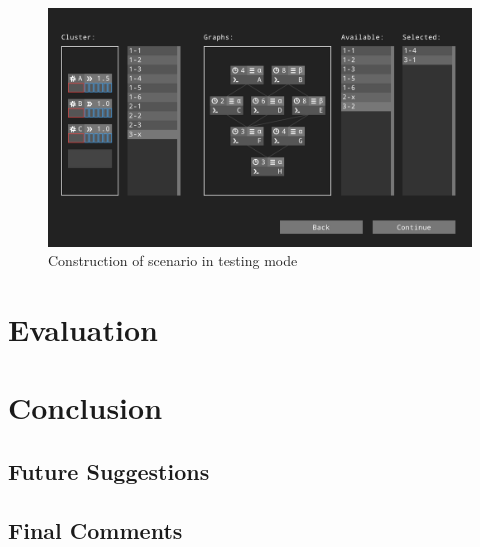 \documentclass[msc,deptreport, cs]{infthesis}
\begin{document}
\begin{figure}[!htb]
  \centering
  \includegraphics[width=\columnwidth]{play3.png}
  \caption{Construction of scenario in testing mode}
  \label{fig:play3}
\end{figure}


\chapter{Evaluation}

\chapter{Conclusion}

\section{Future Suggestions} 


\section{Final Comments}



\end{document}
